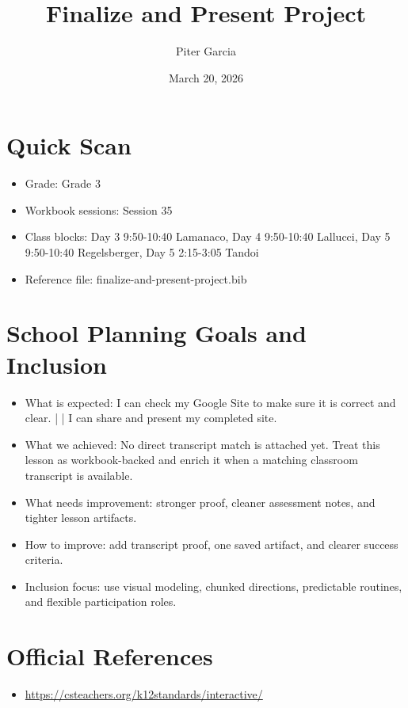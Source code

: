 \documentclass[11pt]{article}
\title{Finalize and Present Project}
\author{Piter Garcia}
\date{March 20, 2026}
\begin{document}
\maketitle
\section*{Quick Scan}
\begin{itemize}[leftmargin=*]
\item Grade: Grade 3
\item Workbook sessions: Session 35
\item Class blocks: Day 3 9:50-10:40 Lamanaco, Day 4 9:50-10:40 Lallucci, Day 5 9:50-10:40 Regelsberger, Day 5 2:15-3:05 Tandoi
\item Reference file: finalize-and-present-project.bib
\end{itemize}
\section*{School Planning Goals and Inclusion}
\begin{itemize}[leftmargin=*]
\item What is expected: I can check my Google Site to make sure it is correct and clear. | | I can share and present my completed site.
\item What we achieved: No direct transcript match is attached yet. Treat this lesson as workbook-backed and enrich it when a matching classroom transcript is available.
\item What needs improvement: stronger proof, cleaner assessment notes, and tighter lesson artifacts.
\item How to improve: add transcript proof, one saved artifact, and clearer success criteria.
\item Inclusion focus: use visual modeling, chunked directions, predictable routines, and flexible participation roles.
\end{itemize}
\section*{Official References}
\begin{itemize}[leftmargin=*]
\item \url{https://csteachers.org/k12standards/interactive/}

\end{itemize}
\end{document}
